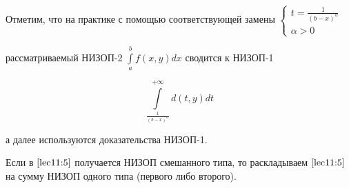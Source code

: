 \documentclass[../../main.tex]{subfiles}
\begin{document}
	Отметим, что на практике с помощью соответствующей замены 
	$\displaystyle 
	\left\{
		\begin{gathered}
			t = \frac{1}{(b - x)^\alpha} \\
			\alpha > 0
		\end{gathered}
	\right.
	$ 
	
	рассматриваемый НИЗОП-2 $\int\limits_a^b f(x, y) dx$ сводится к НИЗОП-1 
	
	\begin{equation}\label{lec11:6}
		\int\limits_{\frac{1}{(b - x)^\alpha}}^{+\infty} d(t, y) dt
	\end{equation}

	а далее используются доказательства НИЗОП-1.
	
	Если в $\eqref{lec11:5}$ получается НИЗОП смешанного типа, то раскладываем 
	$\eqref{lec11:5}$ на сумму НИЗОП одного типа (первого либо второго).
	
\end{document}
